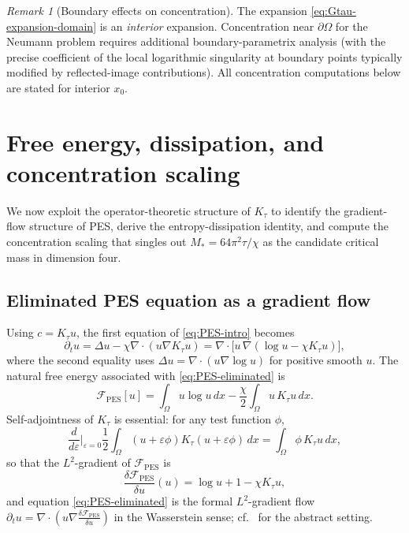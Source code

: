 \documentclass[11pt,reqno]{amsart}
\theoremstyle{definition}
\theoremstyle{remark}
\newtheorem{remark}[theorem]{Remark}
\newcommand{\Free}{\mathcal{F}}
\newcommand{\Div}{\nabla\!\cdot}
\begin{document}
\begin{remark}[Boundary effects on concentration]\label{rem:boundary}
The expansion \eqref{eq:Gtau-expansion-domain} is an \emph{interior} expansion. Concentration near $\partial\Omega$ for the Neumann problem requires additional boundary-parametrix analysis (with the precise coefficient of the local logarithmic singularity at boundary points typically modified by reflected-image contributions). All concentration computations below are stated for interior $x_0$.
\end{remark}

\section{Free energy, dissipation, and concentration scaling}
\label{sec:PES-energy}

We now exploit the operator-theoretic structure of $K_\tau$ to identify the gradient-flow structure of PES, derive the entropy-dissipation identity, and compute the concentration scaling that singles out $M_{\!*}=64\pi^{2}\tau/\chi$ as the candidate critical mass in dimension four.

\subsection{Eliminated PES equation as a gradient flow}
\label{subsec:PES-gradient-flow}

Using $c=K_\tau u$, the first equation of \eqref{eq:PES-intro} becomes
\begin{equation}\label{eq:PES-eliminated}
        \partial_t u=\Delta u-\chi\Div(u\nabla K_\tau u)
        =\Div\!\bigl[u\,\nabla(\log u-\chi K_\tau u)\bigr],
\end{equation}
where the second equality uses $\Delta u=\Div(u\nabla\log u)$ for positive smooth $u$. The natural free energy associated with \eqref{eq:PES-eliminated} is
\begin{equation}\label{eq:PES-free-energy}
        \Free_{\mathrm{PES}}[u]
        =\int_\Omega u\log u\,dx
        -\frac{\chi}{2}\int_\Omega u\,K_\tau u\,dx.
\end{equation}
Self-adjointness of $K_\tau$ is essential: for any test function $\phi$,
\begin{equation}\label{eq:variation-Ktau}
        \frac{d}{d\varepsilon}\bigg|_{\varepsilon=0}\frac{1}{2}\int_\Omega(u+\varepsilon\phi)K_\tau(u+\varepsilon\phi)\,dx
        =\int_\Omega\phi\,K_\tau u\,dx,
\end{equation}
so that the $L^{2}$-gradient of $\Free_{\mathrm{PES}}$ is
\begin{equation}\label{eq:PES-first-variation}
        \frac{\delta\Free_{\mathrm{PES}}}{\delta u}(u)=\log u+1-\chi K_\tau u,
\end{equation}
and equation \eqref{eq:PES-eliminated} is the formal $L^{2}$-gradient flow $\partial_t u=\Div(u\nabla\tfrac{\delta\Free_{\mathrm{PES}}}{\delta u})$ in the Wasserstein sense; cf.~\cite{jordan1998variational, ambrosio2005gradient} for the abstract setting.
\end{document}
